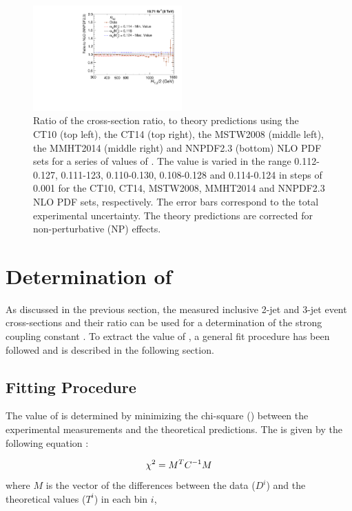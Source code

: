 \begin{figure}[!htbp]
\begin{center}
 \vspace*{3mm}
 \includegraphics[width=0.51\textwidth]{Plots_HT_2_150/Sensitivity_double_ratio_32_NNPDF23.pdf}
 \caption{Ratio of the cross-section ratio, \ratio to theory predictions using the CT10 (top left), the CT14 (top right), the MSTW2008 (middle left), the MMHT2014 (middle right) and NNPDF2.3 (bottom) NLO PDF sets for a series of values of \alpsmz. The \alpsmz value is varied in the range 0.112-0.127, 0.111-123, 0.110-0.130, 0.108-0.128 and 0.114-0.124 in steps of 0.001 for the CT10, CT14, MSTW2008, MMHT2014 and NNPDF2.3 NLO PDF sets, respectively. The error bars correspond to the total experimental uncertainty. The theory predictions are corrected for non-perturbative (NP) effects.}
 \label{fig:sensitivity_double_ratio}
 \end{center}
\end{figure}

\section{Determination of \texorpdfstring{\alpsmz}{alpha-S(M(Z))}}

As discussed in the previous section, the measured inclusive 2-jet and 3-jet event cross-sections and their ratio \ratio can be used for a determination of the strong coupling constant \alpsmz. To extract the value of \alpsmz, a general fit procedure \cite{Chatrchyan:2013txa,Khachatryan:2014waa,Khachatryan:2016mlc} has been followed and is described in the following section. 

\subsection{Fitting Procedure}
\label{sec:Fits_procedure}
The value of \alpsmz is determined by minimizing the chi-square (\chisq) between the experimental measurements and the theoretical predictions. The \chisq is given by the following equation :

\begin{equation}
  \label{chisq}
  \chi^2 = M^{T}C^{-1}M
\end{equation}
where $M$ is the vector of the differences between the data ($D^{i}$) and the theoretical values ($T^{i}$) in each bin $i$,

